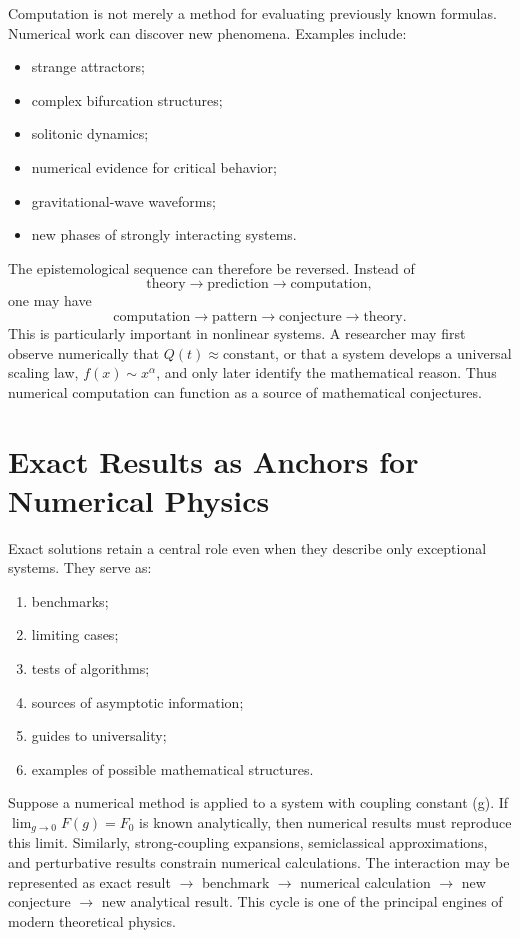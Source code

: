 Computation is not merely a method for evaluating previously known formulas.
Numerical work can discover new phenomena.
Examples include:
\begin{itemize}
\item strange attractors;
\item complex bifurcation structures;
\item solitonic dynamics;
\item numerical evidence for critical behavior;
\item gravitational-wave waveforms;
\item new phases of strongly interacting systems.
\end{itemize}
The epistemological sequence can therefore be reversed.
Instead of
\[
\text{theory}
\rightarrow
\text{prediction}
\rightarrow
\text{computation},
\]
one may have
\[
\text{computation}
\rightarrow
\text{pattern}
\rightarrow
\text{conjecture}
\rightarrow
\text{theory}.
\]
This is particularly important in nonlinear systems.
A researcher may first observe numerically that
$Q(t)\approx \text{constant}$,
or that a system develops a universal scaling law,
$f(x)\sim x^\alpha$,
and only later identify the mathematical reason.
Thus numerical computation can function as a source of mathematical conjectures.

\section{ Exact Results as Anchors for Numerical Physics}
\label{nm:er}

Exact solutions retain a central role even when they describe only exceptional systems.
They serve as:
\begin{enumerate}
\item benchmarks;
\item limiting cases;
\item tests of algorithms;
\item sources of asymptotic information;
\item guides to universality;
\item examples of possible mathematical structures.
\end{enumerate}
Suppose a numerical method is applied to a system with coupling constant (g).
If $\lim_{g\rightarrow 0} F(g)=F_0$
is known analytically, then numerical results must reproduce this limit.
Similarly, strong-coupling expansions, semiclassical approximations, and 
perturbative results constrain numerical calculations.
The interaction may be represented as
exact result $\rightarrow$ benchmark $\rightarrow$ numerical calculation 
$\rightarrow$ new conjecture $\rightarrow$ new analytical result.
This cycle is one of the principal engines of modern theoretical physics.

